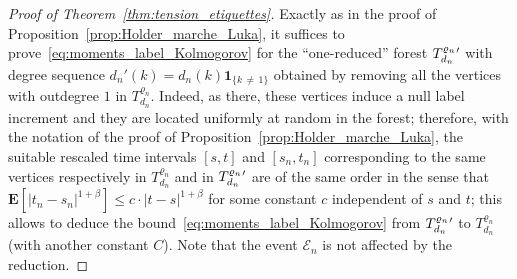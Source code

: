 \documentclass[10pt]{amsart}
\theoremstyle{definition}\newtheorem{defi}[theo]{Definition}\newtheorem{rema}[theo]{Remark}\newtheorem{exam}[theo]{Example}\newtheorem{exem}[theo]{Example}\newtheorem{nota}[theo]{Notation}
\newcommand{\ensembles}[1]{\mathbf{#1}}
\newcommand{\E}{\ensembles{E}}
\newcommand{\1}{\ensembles{1}}
\newcommand{\ind}[1]{\1_{\{#1\}}}
\renewcommand{\le}{\leqslant}
\newcommand{\clE}{\mathcal{E}}
\newcommand{\fn}{T_{d_n}^{\varrho_n}}
\providecommand{\?}{}
\begin{document}
\begin{proof}[Proof of Theorem~\ref{thm:tension_etiquettes}]
Exactly as in the proof of Proposition~\ref{prop:Holder_marche_Luka}, it suffices to prove~\eqref{eq:moments_label_Kolmogorov} for the ``one-reduced'' forest ${\fn}\vphantom{T}'$ with degree sequence $d_n'(k) = d_n(k) \ind{k\,\ne\,1}$ obtained by removing all the vertices with outdegree $1$ in $\fn$. Indeed, as there, these vertices induce a null label increment and they are located uniformly at random in the forest; therefore, with the notation of the proof of Proposition~\ref{prop:Holder_marche_Luka}, the suitable rescaled time intervals $[s,t]$ and $[s_{n}, t_{n}]$ corresponding to the same vertices respectively in $\fn$ and in ${\fn}\vphantom{T}'$ are of the same order in the sense that $\E[|t_{n}-s_{n}|^{1+\beta}] \le c\cdot |t-s|^{1+\beta}$ for some constant $c$ independent of $s$ and $t$; this allows to deduce the bound~\eqref{eq:moments_label_Kolmogorov} from ${\fn}\vphantom{T}'$ to $\fn$ (with another constant $C$). Note that the event $\clE_{n}$ is not affected by the reduction.


\end{proof}
\end{document}
